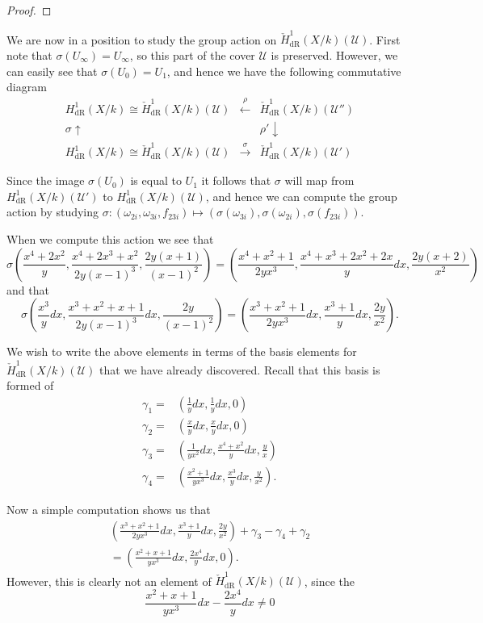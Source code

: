 \documentclass[draft, 11pt]{article} %
\theoremstyle{plain}
\theoremstyle{remark}
\newcommand{\cU}{{\mathcal U}}
\newcommand{\derhamhone}{H_{\text {dR}}^1(X/k)}
\newcommand{\cechderhamhone}{\check{H}_{\text {dR}}^1(X/k)}
\begin{document}
\begin{proof}
\end{proof}

We are now in a position to study the group action on $\cechderhamhone(\cU)$.
First note that $\sigma(U_\infty) = U_\infty$, so this part of the cover $\cU$ is preserved.
However, we can easily see that $\sigma(U_0) = U_1$, and hence we have the following commutative diagram
\[
\begin{array}{ccc}
\derhamhone \cong \cechderhamhone(\cU)  & \xleftarrow{\rho} & \cechderhamhone(\cU'')  \\
\sigma\uparrow & ~ & \rho'\downarrow  \\
\derhamhone \cong \cechderhamhone(\cU)  & \xrightarrow{\sigma} & \cechderhamhone(\cU')
\end{array}
\]

Since the image $\sigma (U_0)$ is equal to $U_1$ it follows that $\sigma$ will map from $\derhamhone(\cU')$ to $\derhamhone(\cU)$, and hence we can compute the group action by studying $\sigma \colon (\omega_{2i}, \omega_{3i}, f_{23i}) \mapsto (\sigma(\omega_{3i}), \sigma (\omega_{2i}), \sigma(f_{23i}))$.

When we compute this action we see that
\[
\sigma\left( \frac{x^4 + 2x^2}{y}, \frac{x^4+2x^3+x^2}{2y(x-1)^3} , \frac{2y(x+1)}{(x-1)^2} \right) = \left( \frac{x^4 + x^2 + 1}{2yx^3}, \frac{x^4 + x^3 + 2x^2 + 2x}{y}dx, \frac{2y(x+2)}{x^2} \right)
\]
and that
\[
\sigma\left( \frac{x^3}{y}dx, \frac{x^3 + x^2 + x + 1}{2y(x-1)^3}dx, \frac{2y}{(x-1)^2} \right) = \left( \frac{x^3 + x^2 + 1}{2yx^3}dx, \frac{x^3 + 1}{y}dx, \frac{2y}{x^2}\right).
\]

We wish to write the above elements in terms of the basis elements for $\cechderhamhone(\cU)$ that we have already discovered.
Recall that this basis is formed of
\begin{align}
\gamma_1  = & \left( \frac{1}{y}dx, \frac{1}{y}dx, 0\right) \\
\gamma_2 = & \left(\frac{x}{y}dx, \frac{x}{y}dx, 0\right) \\
\gamma_3 = & \left( \frac{1}{yx^2}dx, \frac{x^4 + x^2}{y}dx, \frac{y}{x} \right)\\
\gamma_4 = & \left(\frac{x^2+1}{yx^3}dx, \frac{x^3}{y}dx, \frac{y}{x^2} \right).
\end{align}

Now a simple computation shows us that
\begin{multline}
\left( \frac{x^3 + x^2 + 1}{2yx^3}dx, \frac{x^3 + 1}{y}dx, \frac{2y}{x^2}\right) + \gamma_3 - \gamma_4 + \gamma_2 \\
= \left( \frac{x^2 + x + 1}{yx^3}dx, \frac{2x^4}{y}dx, 0 \right).
\end{multline}
However, this is clearly not an element of $\cechderhamhone(\cU)$, since the 
\[
\frac{x^2+x+1}{yx^3}dx - \frac{2x^4}{y}dx \neq 0
\]
\end{document}
